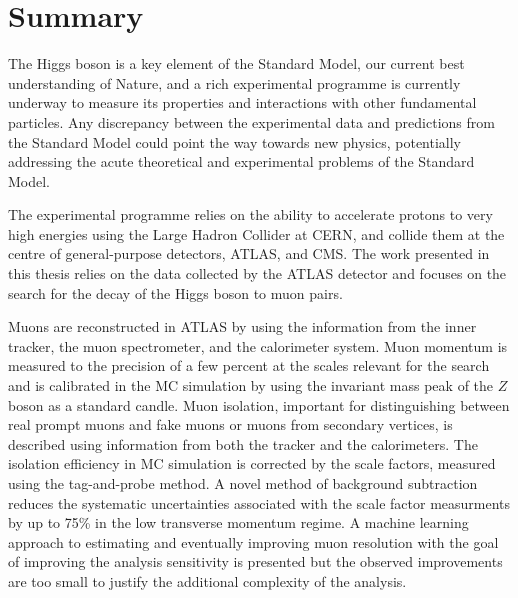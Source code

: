 \chapter*{Summary}

The Higgs boson is a key element of the Standard Model,
our current best understanding of Nature, and a rich experimental
programme is currently underway to measure its properties
and interactions with other fundamental particles. Any
discrepancy between the experimental data and predictions
from the Standard Model could point the way towards new
physics, potentially addressing the acute theoretical
and experimental problems of the Standard Model.

The experimental programme relies on the ability to
accelerate protons to very high energies using the Large
Hadron Collider at CERN, and collide them at the centre of
general-purpose detectors, ATLAS, and CMS. The work presented
in this thesis relies on the data collected by the ATLAS
detector and focuses on the search for the decay of the
Higgs boson to muon pairs.

Muons are reconstructed in ATLAS by using the information
from the inner tracker, the muon spectrometer, and the
calorimeter system. Muon momentum is measured to the
precision of a few percent at the scales relevant for
the search and is calibrated in the MC simulation by using
the invariant mass peak of the $Z$ boson as a standard
candle. Muon isolation, important for distinguishing
between real prompt muons and fake muons or muons from
secondary vertices, is described using information from
both the tracker and the calorimeters. The isolation
efficiency in MC simulation is corrected by the scale
factors, measured using the tag-and-probe method. A
novel method of background subtraction reduces the
systematic uncertainties associated with the
scale factor measurments by up to 75\% in the low transverse
momentum regime. A machine learning approach to
estimating and eventually improving muon resolution
with the goal of improving the analysis sensitivity is
presented but the observed improvements are too small
to justify the additional complexity of the analysis.

